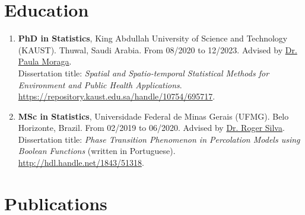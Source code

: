 \documentclass[10pt, ]{article}
\begin{document}
	\section*{Education} \vspace{-5pt}
	
	\begin{enumerate}[noitemsep, topsep=0pt]
		\item \textbf{PhD in Statistics}, King Abdullah University of Science and Technology (KAUST). Thuwal, Saudi Arabia. From 08/2020 to 12/2023. Advised by \href{https://www.paulamoraga.com/}{Dr. Paula Moraga}. %
		\\
		Dissertation title: \textit{Spatial and Spatio-temporal Statistical Methods for Environment and Public Health Applications}. \href{https://repository.kaust.edu.sa/handle/10754/695717}{\url{https://repository.kaust.edu.sa/handle/10754/695717}}.  \vspace{3pt}
		
		\item \textbf{MSc in Statistics}, Universidade Federal de Minas Gerais (UFMG). Belo Horizonte, Brazil. From 02/2019 to 06/2020. Advised by \href{http://www.est.ufmg.br/~rogerwcs/}{Dr. Roger Silva}. %
		\\
		Dissertation title: \textit{Phase Transition Phenomenon in Percolation Models using Boolean Functions} (written in Portuguese). \href{http://hdl.handle.net/1843/51318}{\url{http://hdl.handle.net/1843/51318}}.
		
		
		
	\end{enumerate}
	
	\vspace{10pt}
	
	\vspace{-12pt}
	
	\section*{Publications} \vspace{-5pt}
	
\end{document}
